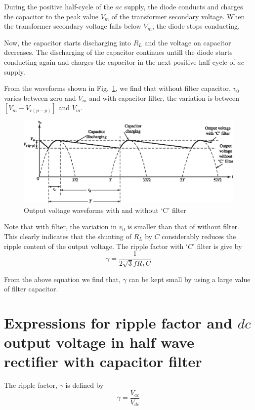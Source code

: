 During the positive half-cycle of the $ac$ supply, the diode conducts
and charges the capacitor to the peak value $V_m$ of the transformer
secondary voltage. When the transformer secondary voltage falls below
$V_m$, the diode stops conducting.

Now, the capacitor starts discharging into 
$R_L$ and the voltage on capacitor decreases. The discharging of the
capacitor continues untill the diode  starts conducting again and
charges the capacitor in the next positive half-cycle of $ac$ supply.

From the waveforms shown in Fig.~\ref{fig2.13}, we find that without filter
capacitor, $v_0$ varies between zero and $V_m$ and with capacitor
filter, the variation is between $[V_m - V_{r(p-p)}]$ and $V_{m}$.
\begin{figure}[H]
\centering
\includegraphics[scale=.93]{chap2/add-fig/S3-EE-02-013.eps}
\caption{Output voltage waveforms with and without `C' filter}\label{fig2.13}
\end{figure}

Note that with filter, the variation in $v_0$ is smaller than that of 
without filter. This clearly indicates that the shunting of $R_L$ by
$C$ considerably reduces the ripple content of the output voltage.
The ripple factor with `$C$' filter is give by 
$$
\gamma = \frac{1}{2 \sqrt{3} f R_L C}
$$

From the above equation we find that, $\gamma$ can be kept small by
using a large value of filter capacitor.

\section{Expressions for ripple factor and $dc$ output voltage in half
wave rectifier with capacitor filter}\label{sec2.20}

The ripple factor, $\gamma$ is defined by
\begin{equation}
\gamma = \frac{V_{ac}}{V_{dc}} \label{eq2.45}
\end{equation}

